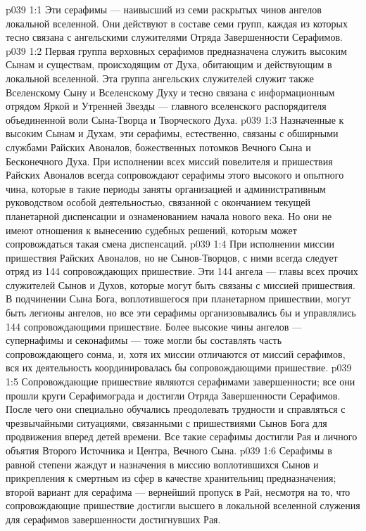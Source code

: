 \vs p039 1:1 Эти серафимы --- наивысший из семи раскрытых чинов ангелов локальной вселенной. Они действуют в составе семи групп, каждая из которых тесно связана с ангельскими служителями Отряда Завершенности Серафимов.
\vs p039 1:2 \bibnobreakspace {} Первая группа верховных серафимов предназначена служить высоким Сынам и существам, происходящим от Духа, обитающим и действующим в локальной вселенной. Эта группа ангельских служителей служит также Вселенскому Сыну и Вселенскому Духу и тесно связана с информационным отрядом Яркой и Утренней Звезды --- главного вселенского распорядителя объединенной воли Сына\hyp{}Творца и Творческого Духа.
\vs p039 1:3 Назначенные к высоким Сынам и Духам, эти серафимы, естественно, связаны с обширными службами Райских Авоналов, божественных потомков Вечного Сына и Бесконечного Духа. При исполнении всех миссий повелителя и пришествия Райских Авоналов всегда сопровождают серафимы этого высокого и опытного чина, которые в такие периоды заняты организацией и административным руководством особой деятельностью, связанной с окончанием текущей планетарной диспенсации и ознаменованием начала нового века. Но они не имеют отношения к вынесению судебных решений, которым может сопровождаться такая смена диспенсаций.
\vs p039 1:4 \pc {} При исполнении миссии пришествия Райских Авоналов, но не Сынов\hyp{}Творцов, с ними всегда следует отряд из 144 сопровождающих пришествие. Эти 144 ангела --- главы всех прочих служителей Сынов и Духов, которые могут быть связаны с миссией пришествия. В подчинении Сына Бога, воплотившегося при планетарном пришествии, могут быть легионы ангелов, но все эти серафимы организовывались бы и управлялись 144 сопровождающими пришествие. Более высокие чины ангелов --- супернафимы и секонафимы --- тоже могли бы составлять часть сопровождающего сонма, и, хотя их миссии отличаются от миссий серафимов, вся их деятельность координировалась бы сопровождающими пришествие.
\vs p039 1:5 Сопровождающие пришествие являются серафимами завершенности; все они прошли круги Серафимограда и достигли Отряда Завершенности Серафимов. После чего они специально обучались преодолевать трудности и справляться с чрезвычайными ситуациями, связанными с пришествиями Сынов Бога для продвижения вперед детей времени. Все такие серафимы достигли Рая и личного объятия Второго Источника и Центра, Вечного Сына.
\vs p039 1:6 Серафимы в равной степени жаждут и назначения в миссию воплотившихся Сынов и прикрепления к смертным из сфер в качестве хранительниц предназначения; второй вариант для серафима --- вернейший пропуск в Рай, несмотря на то, что сопровождающие пришествие достигли высшего в локальной вселенной служения для серафимов завершенности достигнувших Рая.
